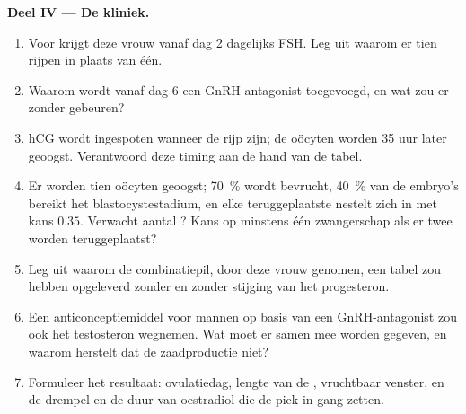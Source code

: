 \begin{problem}
\medskip
\noindent\textbf{Deel IV --- De kliniek.}
\begin{enumerate}[resume]
  \item Voor  krijgt deze vrouw vanaf dag 2 dagelijks
        FSH. Leg uit waarom er tien  rijpen in plaats van één.
  \item Waarom wordt vanaf dag 6 een GnRH-antagonist toegevoegd, en wat zou
        er zonder gebeuren?
  \item hCG wordt ingespoten wanneer de  rijp zijn; de oöcyten
        worden 35 uur later geoogst. Verantwoord deze timing aan de hand van
        de tabel.
  \item Er worden tien oöcyten geoogst; \qty{70}{\%} wordt bevrucht,
        \qty{40}{\%} van de embryo's bereikt het blastocystestadium, en elke
        teruggeplaatste  nestelt zich in met kans $0.35$.
        Verwacht aantal ? Kans op minstens één zwangerschap als
        er twee worden teruggeplaatst?
  \item Leg uit waarom de combinatiepil, door deze vrouw genomen, een tabel
        zou hebben opgeleverd zonder  en zonder stijging van het
        progesteron.
  \item Een anticonceptiemiddel voor mannen op basis van een
        GnRH-antagonist zou ook het testosteron wegnemen. Wat moet er samen
        mee worden gegeven, en waarom herstelt dat de zaadproductie niet?
  \item Formuleer het resultaat: ovulatiedag, lengte van de ,
        vruchtbaar venster, en de drempel en de duur van oestradiol die de
        piek in gang zetten.
\end{enumerate}
\end{problem}
